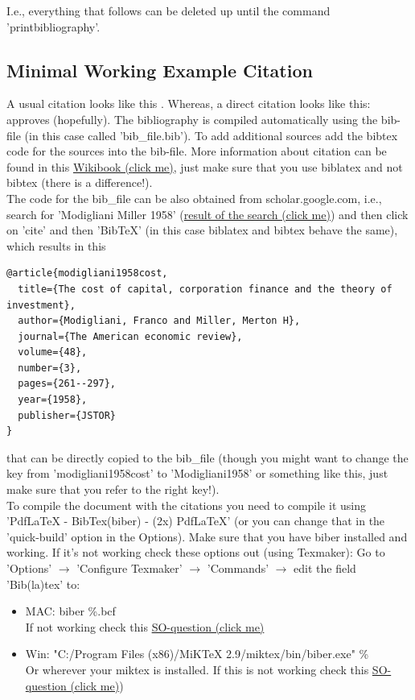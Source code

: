 \documentclass[12pt,a4paper]{article}
\begin{document}
I.e., everything that follows can be deleted up until the command 'printbibliography'.
\subsection{Minimal Working Example Citation}
A usual citation looks like this \parencite{R2016}. Whereas, a direct citation looks like this: \textcite{Hlavac2015} approves (hopefully). The bibliography is compiled automatically using the bib-file (in this case called 'bib\_file.bib'). To add additional sources add the bibtex code for the sources into the bib-file. More information about citation can be found in this \href{https://en.wikibooks.org/wiki/LaTeX/Bibliography_Management#biblatex}{Wikibook (click me)}, just make sure that you use biblatex and not bibtex (there is a difference!).\\

The code for the bib\_file can be also obtained from scholar.google.com, i.e., search for 'Modigliani Miller 1958' (\href{https://scholar.google.de/scholar?hl=en&q=modigliani+miller+1958&btnG=&as_sdt=1%2C5&as_sdtp=}{result of the search (click me)}) and then click on 'cite' and then 'BibTeX' (in this case biblatex and bibtex behave the same), which results in this 
\begin{verbatim}
@article{modigliani1958cost,
  title={The cost of capital, corporation finance and the theory of investment},
  author={Modigliani, Franco and Miller, Merton H},
  journal={The American economic review},
  volume={48},
  number={3},
  pages={261--297},
  year={1958},
  publisher={JSTOR}
}
\end{verbatim}

that can be directly copied to the bib\_file (though you might want to change the key from 'modigliani1958cost' to 'Modigliani1958' or something like this, just make sure that you refer to the right key!).\\

To compile the document with the citations you need to compile it using 'PdfLaTeX - BibTex(biber) - (2x) PdfLaTeX' (or you can change that in the 'quick-build' option in the Options). Make sure that you have biber installed and working. If it's not working check these options out (using Texmaker):
Go to 'Options' $\rightarrow$ 'Configure Texmaker' $\rightarrow$ 'Commands' $\rightarrow$ edit the field 'Bib(la)tex' to:
\begin{itemize}
\item MAC: biber \%.bcf \\
If not working check this \href{http://tex.stackexchange.com/questions/153359/setting-up-texmaker-on-mac-to-work-with-biber}{SO-question (click me)}
\item Win: "C:/Program Files (x86)/MiKTeX 2.9/miktex/bin/biber.exe" \%\\
Or wherever your miktex is installed. If this is not working check this \href{http://tex.stackexchange.com/questions/63039/install-biber-in-miktex-on-a-64-bit-version-of-windows}{SO-question (click me)})
\end{itemize}
\end{document}
